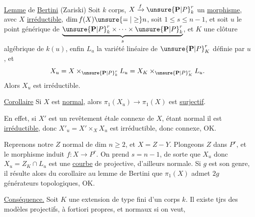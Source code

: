 \uline{Lemme} de \uline{Bertini} (Zariski)
Soit $k$ corps,
$X\xrightarrow{f}\unsure{\mathbf P|P}_k^r$ un \uline{morphisme},
avec $X$ \uline{irréductible},
$\dim f(X)\unsure{=|\geq}n$, soit $1\leq s\leq n-1$, et soit $u$
le point générique de
$\underbrace{\unsure{\mathbf P|P}_k^r\times\cdots\times\unsure{\mathbf P|P}_k^r}_{s}$,
et $K$ une clôture algébrique de $k(u)$,
enfin $L_u$ la variété linéaire de $\unsure{\mathbf P|P}_K^r$ définie par $u$,
et
\[
X_u=X\times_{\unsure{\mathbf P|P}_k^r}L_u=X_K\times_{\unsure{\mathbf P|P}_K^r}L_u.
\]
Alors $X_u$ est irréductible.



\uline{Corollaire} 
Si $X$ est \uline{normal}, alors
$\pi_1(X_u)\to\pi_1(X)$ est \uline{surjectif}.

En effet, si $X'$ est un revêtement 
étale connexe de $X$, étant normal il est \uline{irréductible},
donc $X'_u=X'\times_X X_u$ est irréductible,
donc connexe, OK.


Reprenons notre $Z$ normal de dim $n\geq2$, et $X=Z-Y$.
Plongeons $Z$ dans $P^r$, et le morphisme induit $f:X\to P^r$.
On prend $s=n-1$, de sorte que
$X_u$ 
donc $X_u=Z_K\cap L_u$ est une \uline{courbe} de
 projective, d'ailleurs normale.
Si $g$ est son genre, il résulte alors du corollaire au lemme de Bertini
que $\pi_1(X)$ admet $2g$ générateurs topologiques, OK.

\uline{Conséquence.} Soit $K$ une extension de type fini d'un corps $k$.
Il existe tjrs des modèles projectifs,
à fortiori propres, et normaux si on veut,

